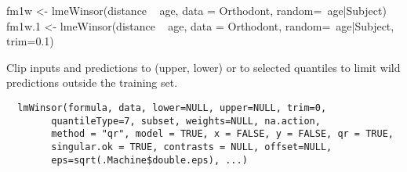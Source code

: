 \documentclass{article}
\begin{document}
\begin{SeeAlso}\relax
{} 
\end{SeeAlso}
\begin{Examples}
\begin{ExampleCode}
fm1w <- lmeWinsor(distance ~ age, data = Orthodont,
                 random=~age|Subject) 
fm1w.1 <- lmeWinsor(distance ~ age, data = Orthodont,
                 random=~age|Subject, trim=0.1) 
\end{ExampleCode}
\end{Examples}

\begin{Description}\relax
Clip inputs and predictions to (upper, lower) or to selected quantiles
to limit wild predictions outside the training set.
\end{Description}
\begin{Usage}
\begin{verbatim}
  lmWinsor(formula, data, lower=NULL, upper=NULL, trim=0,
        quantileType=7, subset, weights=NULL, na.action,
        method = "qr", model = TRUE, x = FALSE, y = FALSE, qr = TRUE,
        singular.ok = TRUE, contrasts = NULL, offset=NULL,
        eps=sqrt(.Machine$double.eps), ...)
\end{verbatim}
\end{Usage}
\end{document}
